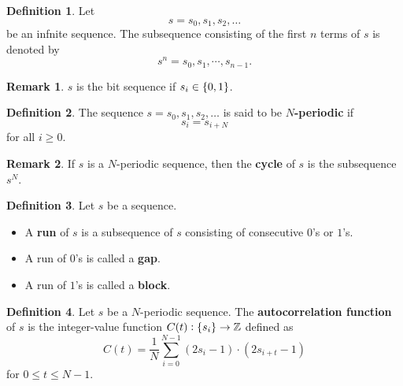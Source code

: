 \documentclass[12pt,openany]{book}
\theoremstyle{definition}
\newtheorem{definition}{Definition}[chapter]
\newtheorem{remark}{Remark}[chapter]
\newcommand{\Z}{\mathbb{Z}}
\begin{document}
\begin{tcolorbox}[colback=white,colframe=defcolor,arc=5pt,title={\color{white}\bf }]
	\begin{definition}
		Let \[
		s=s_0,s_1,s_2,\dots
		\] be an infnite sequence. The subsequence consisting of the first $n$ terms of $s$ is denoted by \[
		s^n=s_0,s_1,\cdots,s_{n-1}.
		\]
	\end{definition}
\end{tcolorbox}
\begin{remark}
	$s$ is the bit sequence if $s_i\in\set{0,1}$.
\end{remark}

\begin{tcolorbox}[colback=white,colframe=defcolor,arc=5pt,title={\color{white}\bf $N$-Periodic}]
	\begin{definition}
		The sequence $s=s_0,s_1,s_2,\dots$ is said to be \textbf{$N$-periodic} if \[
		s_i=s_{i+N}
		\] for all $i\geq 0$.
	\end{definition}
\end{tcolorbox}
\begin{remark}
	If $s$ is a $N$-periodic sequence, then the \textbf{cycle} of $s$ is the subsequence $s^N$.
\end{remark}
\vspace{12pt}
\begin{tcolorbox}[colback=white,colframe=defcolor,arc=5pt,title={\color{white}\bf Run - Gap / Block}]
	\begin{definition}
		Let $s$ be a sequence. \begin{itemize}
			\item A \textbf{run} of $s$ is a subsequence of $s$ consisting of consecutive $0$'s or $1$'s.
			\item A run of $0$'s is called a \textbf{gap}.
			\item A run of $1$'s is called a \textbf{block}.
		\end{itemize}
	\end{definition}
\end{tcolorbox}
\vspace{24pt}
\newpage
\begin{tcolorbox}[colback=white,colframe=defcolor,arc=5pt,title={\color{white}\bf Autocorrelation Function}]
	\begin{definition}
		Let $s$ be a $N$-periodic sequence. The \textbf{autocorrelation function} of $s$ is the integer-value function $C(t):\set{s_i}\to\Z$ defined as \[
		C(t) = \frac{1}{N}\sum_{i=0}^{N-1}(2s_i - 1) \cdot (2s_{i+t} - 1)
		\] for $0\leq t\leq N-1$.
	\end{definition}
\end{tcolorbox}
\end{document}
